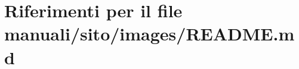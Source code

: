 \hypertarget{manuali_2sito_2images_2README_8md}{}\section{Riferimenti per il file manuali/sito/images/\+R\+E\+A\+D\+ME.md}
\label{manuali_2sito_2images_2README_8md}
